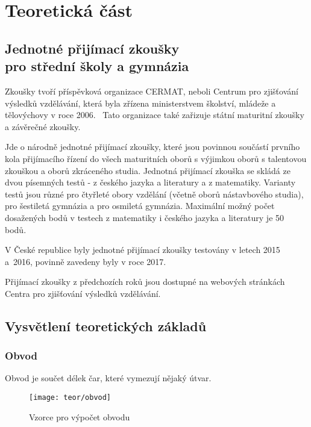 \chapter{Teoretická část}


\section[Jednotné přijímací zkoušky pro střední školy a gymnázia]{Jednotné přijímací zkoušky\\pro střední školy a gymnázia}

Zkoušky tvoří příspěvková organizace CERMAT, neboli Centrum pro zjišťování výsledků vzdělávání, která byla zřízena ministerstvem školství, mládeže a tělovýchovy v roce 2006.~\cite{zakon_CERMAT} Tato organizace také zařizuje státní maturitní zkoušky a závěrečné zkoušky.~\cite{CERMAT_p_m}



Jde o národně jednotné přijímací zkoušky, které jsou povinnou součástí prvního kola přijímacího řízení do všech maturitních oborů s výjimkou oborů s talentovou zkouškou a oborů zkráceného studia.
Jednotná přijímací zkouška se skládá ze dvou písemných testů - z českého jazyka a literatury a z matematiky.
Varianty testů jsou různé pro čtyřleté obory vzdělání (včetně oborů nástavbového studia), pro šestiletá gymnázia a pro osmiletá gymnázia.
Maximální možný počet dosažených bodů v testech z matematiky i českého jazyka a literatury je 50 bodů.~\cite{CERMAT_co_to_je}

V České republice byly jednotné přijímací zkoušky testovány v letech 2015 a~2016, povinně zavedeny byly v roce 2017.~\cite{CERMAT_rocni_zprava}

Přijímací zkoušky z předchozích roků jsou dostupné na webových stránkách Centra pro zjišťování výsledků vzdělávání.~\cite{CERMAT_pdfka}


\section{Vysvětlení teoretických základů}

\subsection{Obvod}
Obvod je součet délek čar, které vymezují nějaký útvar.~\cite{umim_mat}

\begin{figure}[p]
    \caption{Vzorce pro výpočet obvodu~\cite{umim_mat}}
    \centering
    \texttt{[image: teor/obvod]}
\end{figure}

